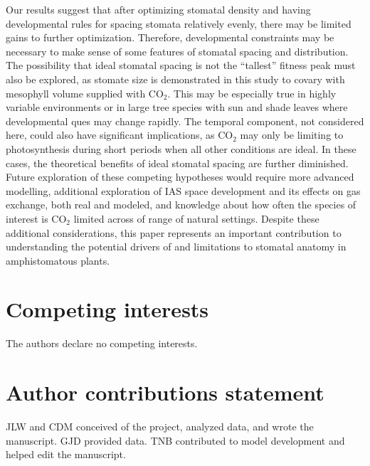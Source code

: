 \documentclass[webpdf,large,modern,unnumsec,namedate]{oup-authoring-template}
\begin{document}
Our results suggest that after optimizing stomatal density and having
developmental rules for spacing stomata relatively evenly, there may be
limited gains to further optimization. Therefore, developmental
constraints may be necessary to make sense of some features of stomatal
spacing and distribution. The possibility that ideal stomatal spacing is
not the ``tallest'' fitness peak must also be explored, as stomate size
is demonstrated in this study to covary with mesophyll volume supplied
with CO\(_2\). This may be especially true in highly variable
environments or in large tree species with sun and shade leaves where
developmental ques may change rapidly. The temporal component, not
considered here, could also have significant implications, as CO\(_2\)
may only be limiting to photosynthesis during short periods when all
other conditions are ideal. In these cases, the theoretical benefits of
ideal stomatal spacing are further diminished. Future exploration of
these competing hypotheses would require more advanced modelling,
additional exploration of IAS space development and its effects on gas
exchange, both real and modeled, and knowledge about how often the
species of interest is CO\(_2\) limited across of range of natural
settings. Despite these additional considerations, this paper represents
an important contribution to understanding the potential drivers of and
limitations to stomatal anatomy in amphistomatous plants.

\section{Competing interests}

The authors declare no competing interests.

\section{Author contributions statement}

JLW and CDM conceived of the project, analyzed data, and wrote the
manuscript. GJD provided data. TNB contributed to model development and
helped edit the manuscript.


\renewcommand\refname{References}




\end{document}
